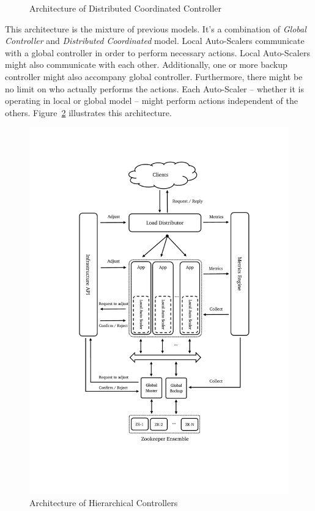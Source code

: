 \begin{description}[leftmargin=0pt]
\begin{figure}[hb]
        \caption{Architecture of Distributed Coordinated Controller}
        \label{fig:auto-scaler-dist-coord}
    \end{figure}
    \clearpage
    \item[Hierarchical Controllers] This architecture is the mixture of previous models. It's a combination of \emph{Global Controller} and \emph{Distributed Coordinated} model. Local Auto-Scalers communicate with a global controller in order to perform necessary actions. Local Auto-Scalers might also communicate with each other. Additionally, one or more backup controller might also accompany global controller. Furthermore, there might be no limit on who actually performs the actions. Each Auto-Scaler -- whether it is operating in local or global model -- might perform actions independent of the others. Figure~\ref{fig:auto-scaler-hierar} illustrates this architecture.
    \begin{figure}[hb]
        \includegraphics[clip,trim=3cm 4.2cm 2.5cm 2.8cm,scale=0.8]{auto-scaler-hierarchy.pdf}
        \centering
        \caption{Architecture of Hierarchical Controllers}
        \label{fig:auto-scaler-hierar}
    \end{figure}
\end{description}

